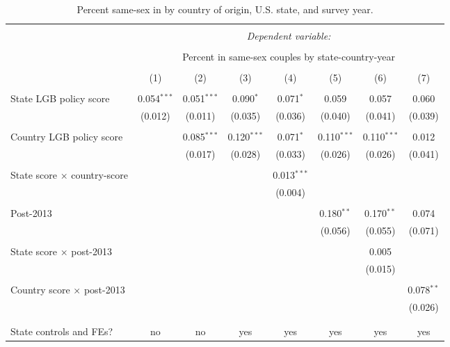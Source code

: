 \documentclass[
  12pt,
]{article}
\begin{document}
\begin{table}[!htbp] \centering 
  \caption{Percent same-sex in by country of origin, U.S. state, and survey year.} 
  \label{tab:state-props} 
\begin{tabular}{@{\extracolsep{5pt}}lccccccc} 
\\[-1.8ex]\hline 
\hline \\[-1.8ex] 
 & \multicolumn{7}{c}{\textit{Dependent variable:}} \\ 
\cline{2-8} 
\\[-1.8ex] & \multicolumn{7}{c}{Percent in same-sex couples by state-country-year} \\ 
\\[-1.8ex] & (1) & (2) & (3) & (4) & (5) & (6) & (7)\\ 
\hline \\[-1.8ex] 
 State LGB policy score & 0.054$^{***}$ & 0.051$^{***}$ & 0.090$^{*}$ & 0.071$^{*}$ & 0.059 & 0.057 & 0.060 \\ 
  & (0.012) & (0.011) & (0.035) & (0.036) & (0.040) & (0.041) & (0.039) \\ 
  & & & & & & & \\ 
 Country LGB policy score &  & 0.085$^{***}$ & 0.120$^{***}$ & 0.071$^{*}$ & 0.110$^{***}$ & 0.110$^{***}$ & 0.012 \\ 
  &  & (0.017) & (0.028) & (0.033) & (0.026) & (0.026) & (0.041) \\ 
  & & & & & & & \\ 
 State score × country-score &  &  &  & 0.013$^{***}$ &  &  &  \\ 
  &  &  &  & (0.004) &  &  &  \\ 
  & & & & & & & \\ 
 Post-2013 &  &  &  &  & 0.180$^{**}$ & 0.170$^{**}$ & 0.074 \\ 
  &  &  &  &  & (0.056) & (0.055) & (0.071) \\ 
  & & & & & & & \\ 
 State score × post-2013 &  &  &  &  &  & 0.005 &  \\ 
  &  &  &  &  &  & (0.015) &  \\ 
  & & & & & & & \\ 
 Country score × post-2013 &  &  &  &  &  &  & 0.078$^{**}$ \\ 
  &  &  &  &  &  &  & (0.026) \\ 
  & & & & & & & \\ 
\hline \\[-1.8ex] 
State controls and FEs? & no & no & yes & yes & yes & yes & yes \\ 

\end{tabular}
\end{table}
\end{document}
